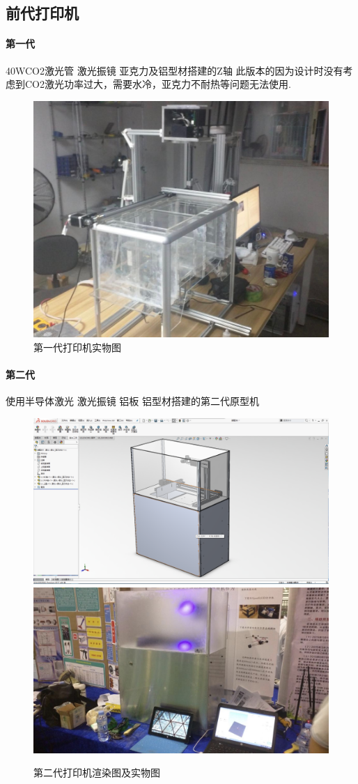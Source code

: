 \documentclass[a4paper,12pt,onecolumn,twoside]{article}
\begin{document}
\subsection{前代打印机}
\paragraph{第一代}
40WCO2激光管 激光振镜 亚克力及铝型材搭建的Z轴
此版本的因为设计时没有考虑到CO2激光功率过大，需要水冷，亚克力不耐热等问题无法使用.\\
\begin{figure}[ht]
\centering     
\includegraphics[width=0.8\linewidth]{MGSLS1_0.jpg}
\caption{第一代打印机实物图}
\end{figure}
\newpage
\paragraph{第二代}
使用半导体激光 激光振镜 铝板 铝型材搭建的第二代原型机
\begin{figure}[ht]
\centering     
\includegraphics[width=0.8\linewidth]{MGSLS2_0.png}
\centering     
\includegraphics[width=0.8\linewidth]{MGSLS2_1.jpg}
\caption{第二代打印机渲染图及实物图}
\end{figure}
\end{document}
